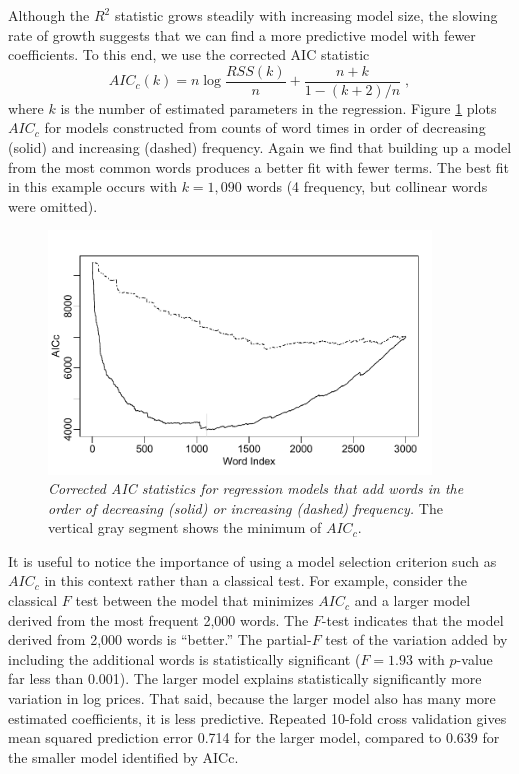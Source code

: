 \documentclass[10pt]{article}
\begin{document}
Although the $R^2$ statistic grows steadily with increasing model size, the slowing rate of growth suggests that we can find a more predictive model with fewer coefficients.  To this end, we use the corrected AIC statistic \citep{hurvich89}
\begin{equation}
    AIC_{c}(k) = n \log \frac{RSS(k)}{n} + \frac{n+k}{1-(k+2)/n} \;,
\end{equation}
where $k$ is the number of estimated parameters in the regression.  Figure \ref{fig:aicwords} plots $AIC_c$ for models constructed from counts of word times in order of decreasing (solid) and increasing (dashed) frequency.  Again we find that building up a model from the most common words produces a better fit with fewer terms.  The best fit in this example occurs with $k=1,090$ words (4 frequency, but collinear words were omitted).


\begin{figure}
\caption{  \label{fig:aicwords}  
  {\sl Corrected AIC statistics for regression models that add words in the order of decreasing (solid) or increasing (dashed) frequency.}  The vertical gray segment shows the minimum of $AIC_c$.}
  \centerline{ \includegraphics[width=4in]{figures/aic_words.pdf} }
\end{figure}


It is useful to notice the importance of using a model selection criterion such as $AIC_c$ in this context rather than a classical test.  For example, consider the classical $F$ test between the  model that minimizes $AIC_c$ and a larger model derived from the most frequent 2,000 words.  The $F$-test indicates that the model derived from 2,000 words is ``better.''  The  partial-$F$ test of the variation added by including the additional words is statistically significant ($F = 1.93$ with $p$-value far less than 0.001).  The larger model explains statistically significantly more variation in log prices.  That said, because the larger model also has many more estimated coefficients, it is less predictive.  Repeated 10-fold cross validation gives mean squared prediction error 0.714 for the larger model, compared to 0.639 for the smaller model identified by AICc.
\end{document}
